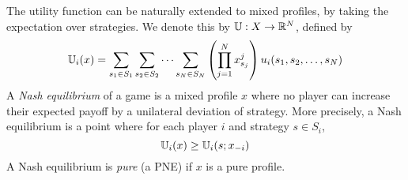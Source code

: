 \documentclass[preprint,authoryear]{elsarticle}
\begin{document}
The utility function can be naturally extended to mixed profiles, by taking the expectation over strategies. We denote this by $\mathbb{U} : X \to \mathbb{R}^N$, defined by
\begin{equation} \label{def: expected utility}
\mathbb{U}_i(x) = \sum_{s_1\in S_1} \sum_{s_2\in S_2} 
    \dots\sum_{s_N\in S_N} \left(\prod_{j = 1}^N x^j_{s_j}\right) u_i(s_1,s_2,\dots,s_N)
\end{equation}
A \emph{Nash equilibrium} of a game is a mixed profile $x$ where no player can increase their expected payoff by a unilateral deviation of strategy. More precisely, a Nash equilibrium is a point where for each player $i$ and strategy $s\in S_i$,
\begin{equation} \label{def: nash equilibrium}
\mathbb{U}_i(x) \geq \mathbb{U}_i(s;x_{-i})
\end{equation}
A Nash equilibrium is \emph{pure} (a PNE) if $x$ is a pure profile.
\end{document}
